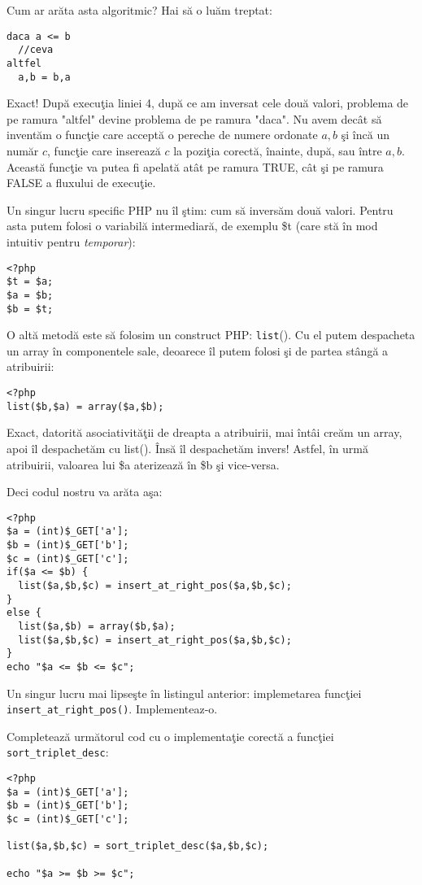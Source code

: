 Cum ar arăta asta algoritmic? Hai să o luăm treptat:
\begin{lstlisting}[language=pseudocod]
daca a <= b
  //ceva
altfel
  a,b = b,a
\end{lstlisting}
Exact! După execuţia liniei 4, după ce am inversat cele două valori, problema de pe ramura
"altfel" devine problema de pe ramura "daca". Nu avem decât să inventăm o funcţie
care acceptă o pereche de numere ordonate $a,b$ şi încă un număr $c$, funcţie care inserează
$c$ la poziţia corectă, înainte, după, sau între $a,b$. Această funcţie va putea
fi apelată atât pe ramura TRUE, cât şi pe ramura FALSE a fluxului de execuţie.

Un singur lucru specific PHP nu îl ştim: cum să inversăm două valori. Pentru
asta putem folosi o variabilă intermediară, de exemplu \$t (care stă în mod intuitiv
pentru \textit{temporar}):
\begin{lstlisting}
<?php
$t = $a;
$a = $b;
$b = $t;
\end{lstlisting}

O altă metodă este să folosim un construct PHP: \texttt{list}().
Cu el putem despacheta un array în componentele sale, deoarece îl
putem folosi şi de partea stângă a atribuirii:
\begin{lstlisting}
<?php
list($b,$a) = array($a,$b);
\end{lstlisting}
Exact, datorită asociativităţii de dreapta a atribuirii, mai întâi
creăm un array, apoi îl despachetăm cu list(). Însă îl despachetăm invers!
Astfel, în urmă atribuirii, valoarea lui \$a aterizează în \$b şi vice-versa.

Deci codul nostru va arăta aşa:
\begin{lstlisting}
<?php
$a = (int)$_GET['a'];
$b = (int)$_GET['b'];
$c = (int)$_GET['c'];
if($a <= $b) {
  list($a,$b,$c) = insert_at_right_pos($a,$b,$c);
}
else {
  list($a,$b) = array($b,$a);
  list($a,$b,$c) = insert_at_right_pos($a,$b,$c);
}
echo "$a <= $b <= $c";
\end{lstlisting}

\begin{Exercise}[title={Insert at the right position},difficulty=3]
\ExePart
Un singur lucru mai lipseşte în listingul anterior: implemetarea funcţiei
\texttt{insert\_at\_right\_pos()}. Implementeaz-o.

\ExePart
Completează următorul cod cu o implementaţie corectă a funcţiei
\texttt{sort\_triplet\_desc}:
\begin{lstlisting}
<?php
$a = (int)$_GET['a'];
$b = (int)$_GET['b'];
$c = (int)$_GET['c'];

list($a,$b,$c) = sort_triplet_desc($a,$b,$c);

echo "$a >= $b >= $c";
\end{lstlisting}
\end{Exercise}

